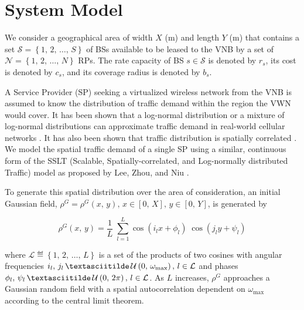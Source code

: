 \documentclass[conference]{IEEEtran}
\begin{document}


\section{System Model} \label{sec:model}
We consider a geographical area of width $X$ (m) and length $Y$ (m) that contains a set $\mathcal{S} = \left\{1,\, 2,\, \ldots,\, S\right\}$ of BSs available to be leased to the VNB by a set of $\mathcal{N} = \left\{1,\, 2,\, \ldots,\, N\right\}$ RPs.  The rate capacity of BS $s \in \mathcal{S}$ is denoted by $r_s$, its cost is denoted by $c_s$, and its coverage radius is denoted by $b_s$.

A Service Provider (SP) seeking a virtualized wireless network from the VNB is assumed to know the distribution of traffic demand within the region the VWN would cover.  It has been shown that a log-normal distribution or a mixture of log-normal distributions can approximate traffic demand in real-world cellular networks \cite{686105, 5936263}.  It has also been shown that traffic distribution is spatially correlated \cite{5936263, eigenplaces}.  We model the spatial traffic demand of a single SP using a similar, continuous form of the SSLT (Scalable, Spatially-correlated, and Log-normally distributed Traffic) model as proposed by Lee, Zhou, and Niu \cite{6554749}.

To generate this spatial distribution over the area of consideration, an initial Gaussian field, $\rho^G = \rho^G\left(x,\, y\right),\, x \in \left[0,\, X\right],\, y \in \left[0,\, Y\right]$, is generated by

\begin{equation}
\rho^G\left(x,\, y\right)=\frac{1}{L} \; \sum_{l=1}^L \cos\left(i_lx+\phi_l\right) \; \cos\left(j_ly+\psi_l\right)
\end{equation} \label{eq:rhoG}

\noindent where $\mathcal{L} \eqdef \left\{1,\, 2,\, \ldots,\, L\right\}$ is a set of the products of two cosines with angular frequencies $i_l,\, j_l\, \textasciitilde\, \mathcal{U}\left(0,\, \omega_{\max}\right),\, l \in \mathcal{L}$ and phases $\phi_l,\, \psi_l\, \textasciitilde\, \mathcal{U}\left(0,\, 2\pi\right),\, l \in \mathcal{L}$.  As $L$ increases, $\rho^G$ approaches a Gaussian random field with a spatial autocorrelation dependent on $\omega_{\max}$ according to the central limit theorem.
\end{document}
